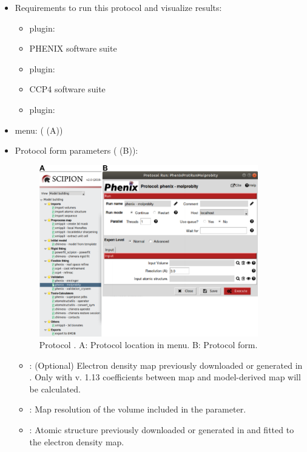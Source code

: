 \begin{itemize}
 \item Requirements to run this protocol and visualize results:
    \begin{itemize}
        \item \scipion plugin: 
        \item PHENIX software suite 
        \item \scipion plugin: 
        \item CCP4 software suite 
        \item \scipion plugin: 
    \end{itemize}
 \item \scipion menu:
   ( (A))
  
 \item Protocol form parameters ( (B)):
  
    \begin{figure}[H]
     \centering 
     \captionsetup{width=.7\linewidth} 
     \includegraphics[width=0.90\textwidth]{Images_appendix/Fig143.pdf}
     \caption{Protocol . A: Protocol location in \scipion menu. B: Protocol form.}
     \label{fig:app_protocol_molprobity_1}
    \end{figure}

    \begin{itemize}
     \item {}: (Optional) Electron density map previously downloaded or generated in \scipion. Only with \phenix v. 1.13  coefficients between map and model-derived map will be calculated.
     \item {}: Map resolution of the volume included in the  parameter.
     \item {}: Atomic structure previously downloaded or generated in \scipion and fitted to the electron density map.
    \end{itemize}
    

\end{itemize}
